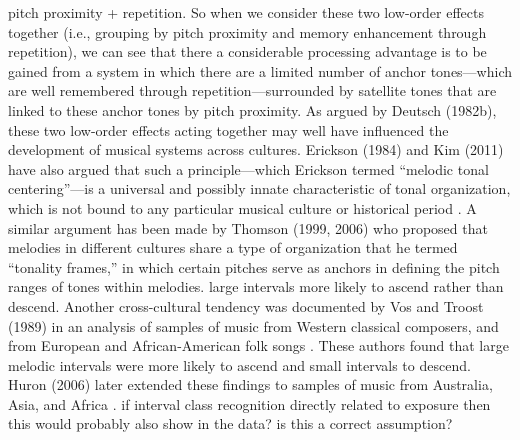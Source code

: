 pitch proximity + repetition. So when we consider these two low-order effects together (i.e., grouping by pitch proximity and memory enhancement through repetition), we can see that there a considerable processing advantage is to be gained from a system in which there are a limited number of anchor tones—which are well remembered through repetition—surrounded by satellite tones that are linked to these anchor tones by pitch proximity. As argued by Deutsch (1982b), these two low-order effects acting together may well have influenced the development of musical systems across cultures. Erickson (1984) and Kim (2011) have also argued that such a principle—which Erickson termed “melodic tonal centering”—is a universal and possibly innate characteristic of tonal organization, which is not bound to any particular musical culture or historical period \cite{erickson1984perceptual} \cite{kim2011tonality}. A similar argument has been made by Thomson (1999, 2006) who proposed that melodies in different cultures share a type of organization that he termed “tonality frames,” in which certain pitches serve as anchors in defining the pitch ranges of tones within melodies.
large intervals more likely to ascend rather than descend. Another cross-cultural tendency was documented by Vos and Troost (1989) in an analysis of samples of music from Western classical composers, and from European and African-American folk songs \cite{vos1989ascending}. These authors found that large melodic intervals were more likely to ascend and small intervals to descend. Huron (2006) later extended these findings to samples of music from Australia, Asia, and Africa \cite{huron2006sweet}. if interval class recognition directly related to exposure then this would probably also show in the data? is this a correct assumption?
